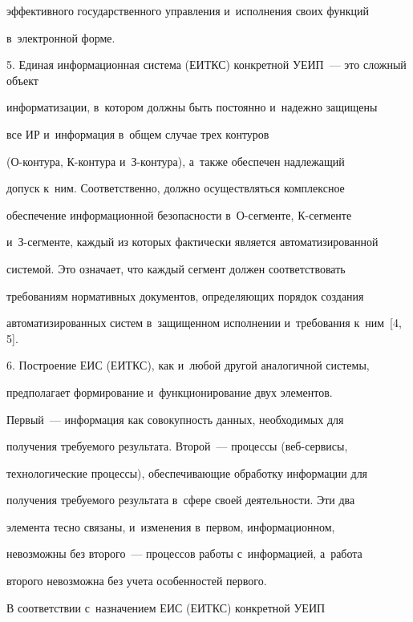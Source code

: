 эффективного государственного управления и~исполнения своих функций 

в~электронной форме.

     

     \smallskip

     

     5. Единая информационная система (ЕИТКС) конкретной УЕИП~--- это сложный объект 

информатизации, в~котором должны быть постоянно и~надежно защищены 

все ИР и~информация в~общем случае трех контуров 

(О-кон\-ту\-ра, К-кон\-ту\-ра и~З-кон\-ту\-ра), а~также обеспечен надлежащий 

допуск к~ним. Соответственно, должно осуществляться комплексное 

обеспечение информационной безопасности в~О-сег\-мен\-те, К-сег\-мен\-те

и~З-сег\-мен\-те, каждый из которых фактически является автоматизированной 

системой. Это означает, что каждый сегмент должен соответствовать 

требованиям нормативных документов, определяющих порядок создания 

автоматизированных систем в~защищенном исполнении и~требования к~ним~[4, 5].

     

     \smallskip

     

     6. Построение ЕИС (ЕИТКС), как и~любой другой аналогичной системы, 

предполагает формирование и~функционирование двух элементов.  

Первый~--- информация как совокупность данных, необходимых для 

получения требуемого результата. Второй~--- процессы (веб-сервисы, 

технологические процессы), обеспечивающие обработку информации для 

получения требуемого результата в~сфере своей деятельности. Эти два 

элемента тесно связаны, и~изменения в~первом, информационном, 

невозможны без второго~--- процессов работы с~информацией, а~работа 

второго невозможна без учета особенностей первого.

     

     В соответствии с~назначением ЕИС (ЕИТКС) конкретной УЕИП 

